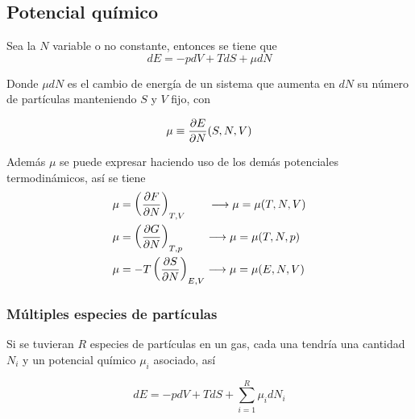 \subsection{Potencial químico}

Sea la $N$ variable o no constante, entonces se tiene que 
\[dE = -pdV + TdS + \mu dN\]

Donde $\mu dN$ es el cambio de energía de un sistema que aumenta en $dN$ su número de partículas manteniendo $S$ y $V$ fijo, con

\[\mu \equiv \parfrac{E}{N}(S,N,V)\]

Además $\mu$ se puede expresar haciendo uso de los demás potenciales termodinámicos, así se tiene
\begin{equation}
    \begin{split}
        \mu &= \devtermo{T,V}{F}{N} \quad \quad \longrightarrow \mu = \mu(T,N,V)\\
        \mu &= \devtermo{T,p}{G}{N} \quad \quad \longrightarrow \mu = \mu(T,N,p)\\
        \mu &= -T\devtermo{E,V}{S}{N} \longrightarrow \mu = \mu(E,N,V)\\
    \end{split}
    \nonumber
\end{equation}

\subsubsection{Múltiples especies de partículas}

Si se tuvieran $R$ especies de partículas en un gas, cada una tendría una cantidad $N_i$ y un potencial químico $\mu_i$ asociado, así

\[ dE = -pdV + TdS + \sum_{i=1}^R\mu_i dN_i \]




\newpage